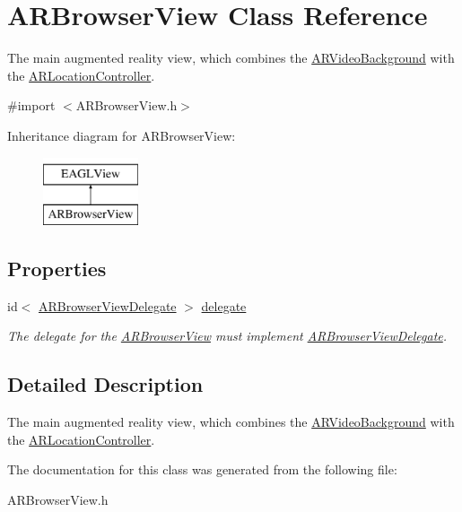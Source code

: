 \hypertarget{interface_a_r_browser_view}{
\section{ARBrowserView Class Reference}
\label{interface_a_r_browser_view}
}


The main augmented reality view, which combines the \hyperlink{interface_a_r_video_background}{ARVideoBackground} with the \hyperlink{interface_a_r_location_controller}{ARLocationController}.  




{\ttfamily \#import $<$ARBrowserView.h$>$}

Inheritance diagram for ARBrowserView:\begin{figure}[H]
\begin{center}
\leavevmode
\includegraphics[height=2.000000cm]{interface_a_r_browser_view}
\end{center}
\end{figure}
\subsection*{Properties}
\begin{DoxyCompactItemize}
\item 
\hypertarget{interface_a_r_browser_view_ac71040f5d7529f5d1585f774524e6e48}{
id$<$ \hyperlink{protocol_a_r_browser_view_delegate-p}{ARBrowserViewDelegate} $>$ \hyperlink{interface_a_r_browser_view_ac71040f5d7529f5d1585f774524e6e48}{delegate}}
\label{interface_a_r_browser_view_ac71040f5d7529f5d1585f774524e6e48}

\begin{DoxyCompactList}\small\item\em The delegate for the \hyperlink{interface_a_r_browser_view}{ARBrowserView} must implement \hyperlink{protocol_a_r_browser_view_delegate-p}{ARBrowserViewDelegate}. \end{DoxyCompactList}\end{DoxyCompactItemize}


\subsection{Detailed Description}
The main augmented reality view, which combines the \hyperlink{interface_a_r_video_background}{ARVideoBackground} with the \hyperlink{interface_a_r_location_controller}{ARLocationController}. 

The documentation for this class was generated from the following file:\begin{DoxyCompactItemize}
\item 
ARBrowserView.h\end{DoxyCompactItemize}
